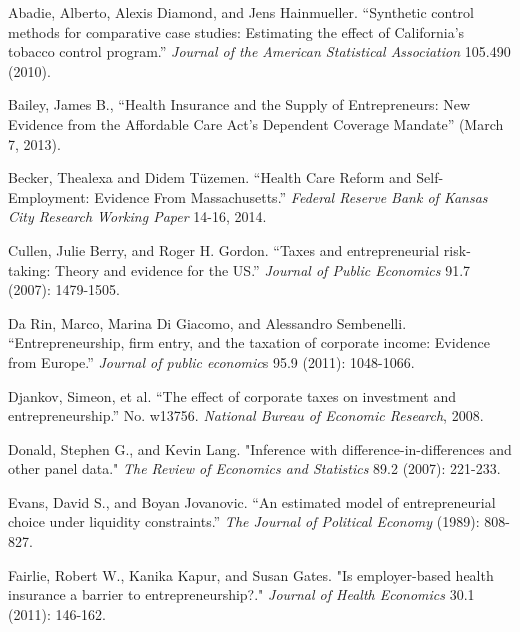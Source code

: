 \begin{singlespace}



\begin{thebibliography}{99}

Abadie, Alberto, Alexis Diamond, and Jens Hainmueller. ``Synthetic control methods for comparative case studies: Estimating the effect of California's tobacco control program.'' \emph{Journal of the American Statistical Association} 105.490 (2010).

Bailey, James B., ``Health Insurance and the Supply of Entrepreneurs: New Evidence from the Affordable Care Act's Dependent Coverage Mandate'' (March 7, 2013). 

Becker, Thealexa and Didem T\"{u}zemen. ``Health Care Reform and Self-Employment: Evidence From Massachusetts.'' \emph{Federal Reserve Bank of Kansas City Research Working Paper} 14-16, 2014.

Cullen, Julie Berry, and Roger H. Gordon. ``Taxes and entrepreneurial risk-taking: Theory and evidence for the US.'' \emph{Journal of Public Economics} 91.7 (2007): 1479-1505.

Da Rin, Marco, Marina Di Giacomo, and Alessandro Sembenelli. ``Entrepreneurship, firm entry, and the taxation of corporate income: Evidence from Europe.'' \emph{Journal of public economic}s 95.9 (2011): 1048-1066.

Djankov, Simeon, et al. ``The effect of corporate taxes on investment and entrepreneurship.'' No. w13756. \emph{National Bureau of Economic Research}, 2008.

Donald, Stephen G., and Kevin Lang. "Inference with difference-in-differences and other panel data." \emph{The Review of Economics and Statistics} 89.2 (2007): 221-233.

Evans, David S., and Boyan Jovanovic. ``An estimated model of entrepreneurial choice under liquidity constraints.'' \emph{The Journal of Political Economy} (1989): 808-827.

Fairlie, Robert W., Kanika Kapur, and Susan Gates. "Is employer-based health insurance a barrier to entrepreneurship?." \emph{Journal of Health Economics} 30.1 (2011): 146-162.


\end{thebibliography}
\end{singlespace}
